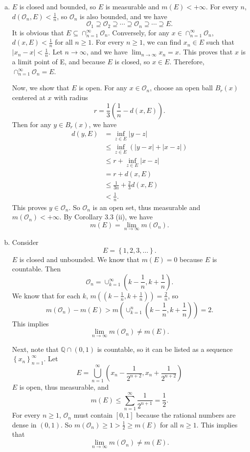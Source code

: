 \documentclass[letterpaper, 12pt]{article}
\begin{document}
\begin{solution}
\begin{enumerate}[(a)]
  \item \(E\) is closed and bounded, so \(E\) is measurable and \(m(E)<+\infty\). For every \(n\), \(d(\mathcal{O}_n,E)<\frac{1}{n}\), so \(\mathcal{O}_n\) is also bounded, and we have 
  \[\mathcal{O}_1\supseteq \mathcal{O}_2\supseteq \cdots \supseteq \mathcal{O}_n\supseteq \cdots\supseteq E.\]
  It is obvious that \(E\subseteq \cap_{n=1}^\infty \mathcal{O}_n\). Conversely, for any \(x\in \cap_{n=1}^\infty \mathcal{O}_n\), \(d(x,E)<\frac{1}{n}\) for all \(n\geq 1\). For every \(n\geq 1\), we can find \(x_n\in E\) such that \(|x_n-x|<\frac{1}{n}\). Let \(n\to \infty\), and we have \(\lim_{n\to \infty}x_n=x\). This proves that \(x\) is a limit point of E, and because \(E\) is closed, so \(x\in E\). Therefore, \(\cap_{n=1}^\infty \mathcal{O}_n=E\). 
 
  Now, we show that \(E\) is open. For any \(x\in \mathcal{O}_n\), choose an open ball \(B_r(x)\) centered at \(x\) with radius 
  \[r=\frac{1}{3}(\frac{1}{n}-d(x,E)).\]
  Then for any \(y\in B_r(x)\), we have 
  \begin{align*}
       d(y,E)&=\inf_{z\in E}|y-z|\\ 
             &\leq \inf_{z\in E}(|y-x|+|x-z|)\\
             &\leq r+\inf_{z\in E}|x-z|\\ 
             &= r+d(x,E)\\
             &\leq \frac{1}{3n}+\frac{2}{3}d(x,E)\\
             &<\frac{1}{n}.
  \end{align*}
  This proves \(y\in \mathcal{O}_n\). So \(\mathcal{O}_n\) is an open set, thus measurable and \(m(\mathcal{O}_n)<+\infty\). By Corollary 3.3 (ii), we have 
  \[m(E)=\lim_{n\to\infty}m(\mathcal{O}_n).\]
  \item Consider 
  \[E=\left\{ 1,2,3,\ldots \right\}.\]
  \(E\) is closed and unbounded. We know that \(m(E)=0\) because \(E\) is countable. Then 
  \[\mathcal{O}_n=\cup_{k=1}^\infty (k-\frac{1}{n},k+\frac{1}{n}).\]
  We know that for each \(k\), \(m((k-\frac{1}{n},k+\frac{1}{n}))=\frac{2}{n}\), so 
  \[m(\mathcal{O}_n)-m(E)>m(\cup_{k=1}^n(k-\frac{1}{n},k+\frac{1}{n}))=2.\]
  This implies 
  \[\lim_{n\to \infty}m(\mathcal{O}_n)\neq m(E).\]

  Next, note that \(\mathbb{Q}\cap (0,1)\) is countable, so it can be listed as a sequence \(\left\{ x_n \right\}_{n=1}^\infty\). Let 
  \[E=\bigcup_{n=1}^\infty(x_n-\frac{1}{2^{n+2}},x_n+\frac{1}{2^{n+2}})\]
  \(E\) is open, thus measurable, and 
  \[m(E)\leq \sum_{n=1}^{\infty}\frac{1}{2^{n+1}}=\frac{1}{2}.\]
  For every \(n\geq 1\), \(\mathcal{O}_n\) must contain \([0,1]\) because the rational numbers are dense in \((0,1)\). So \(m(\mathcal{O}_n)\geq 1>\frac{1}{2}\geq m(E)\) for all \(n\geq 1\). This implies that 
  \[\lim_{n\to \infty}m(\mathcal{O}_n)\neq m(E).\]
\end{enumerate}
\end{solution}
\end{document}

